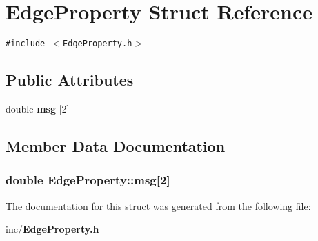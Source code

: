 \section{EdgeProperty Struct Reference}
\label{structEdgeProperty}
{\tt \#include $<$EdgeProperty.h$>$}

\subsection*{Public Attributes}
\begin{CompactItemize}
\item 
double {\bf msg} [2]
\end{CompactItemize}


\subsection{Member Data Documentation}
\subsubsection{\setlength{\rightskip}{0pt plus 5cm}double {\bf EdgeProperty::msg}[2]}\label{structEdgeProperty_07dfcb88013debef49aa1aaf6bcba611}




The documentation for this struct was generated from the following file:\begin{CompactItemize}
\item 
inc/{\bf EdgeProperty.h}\end{CompactItemize}
